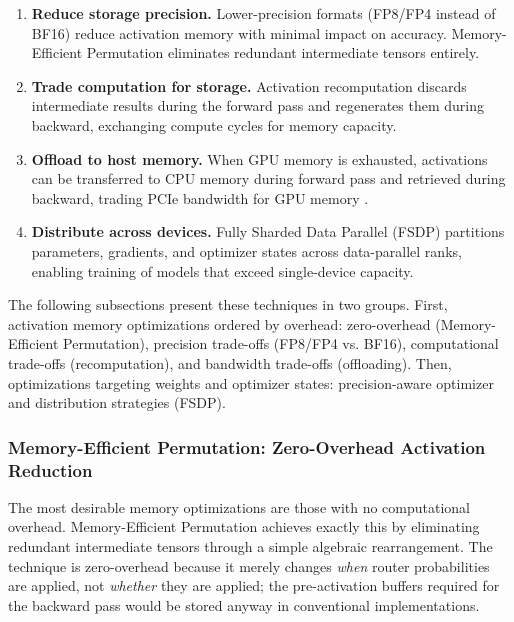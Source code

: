 \documentclass[10pt,logo,copyright]{nvidiatechreport}
\begin{document}
\begin{enumerate}
    \item \textbf{Reduce storage precision.} Lower-precision formats (FP8/FP4 instead of BF16) reduce activation memory with minimal impact on accuracy. Memory-Efficient Permutation eliminates redundant intermediate tensors entirely.
    \item \textbf{Trade computation for storage.} Activation recomputation \cite{chen2016training,korthikanti2022reducingactivationrecomputationlarge,beaumont2021optimal} discards intermediate results during the forward pass and regenerates them during backward, exchanging compute cycles for memory capacity.
    \item \textbf{Offload to host memory.} When GPU memory is exhausted, activations can be transferred to CPU memory during forward pass and retrieved during backward, trading PCIe bandwidth for GPU memory \cite{ren2021zerooffload}.
    \item \textbf{Distribute across devices.} Fully Sharded Data Parallel (FSDP) \cite{zhao2023pytorchfsdp,rajbhandari2020zero,rajbhandari2021zeroinf,rajbhandari2023zeropp} partitions parameters, gradients, and optimizer states across data-parallel ranks, enabling training of models that exceed single-device capacity. 
\end{enumerate}

The following subsections present these techniques in two groups. First, activation memory optimizations ordered by overhead: zero-overhead (Memory-Efficient Permutation), precision trade-offs (FP8/FP4 vs. BF16), computational trade-offs (recomputation), and bandwidth trade-offs (offloading). Then, optimizations targeting weights and optimizer states: precision-aware optimizer and distribution strategies (FSDP).

\subsubsection{Memory-Efficient Permutation: Zero-Overhead Activation Reduction}\label{sec:mem-eff-permute}

The most desirable memory optimizations are those with no computational overhead. Memory-Efficient Permutation achieves exactly this by eliminating redundant intermediate tensors through a simple algebraic rearrangement. The technique is zero-overhead because it merely changes \emph{when} router probabilities are applied, not \emph{whether} they are applied; the pre-activation buffers required for the backward pass would be stored anyway in conventional implementations.
\end{document}
